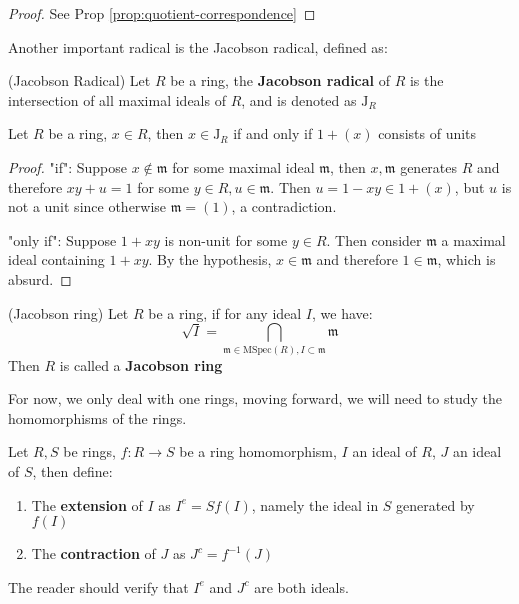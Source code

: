 \documentclass{note-eng}
\begin{document}
\begin{proof}
    See Prop \ref{prop:quotient-correspondence}
\end{proof}

Another important radical is the Jacobson radical, defined as:

\begin{definition}
    (Jacobson Radical) Let $R$ be a ring, the \textbf{Jacobson radical} of $R$ is the intersection of all maximal ideals of $R$, and is denoted as $\mathrm{J}_R$
\end{definition}

\begin{proposition}
    Let $R$ be a ring, $x \in R$, then $x \in \mathrm{J}_R$ if and only if $1 + (x)$ consists of units
\end{proposition}

\begin{proof}
    "if": Suppose $x \notin \mathfrak{m}$ for some maximal ideal $\mathfrak{m}$, then $x, \mathfrak{m}$ generates $R$ and therefore $xy + u = 1$ for some $y \in R, u \in \mathfrak{m}$. Then $u = 1 - xy \in 1 + (x)$, but $u$ is not a unit since otherwise $\mathfrak{m} = (1)$, a contradiction.

    "only if": Suppose $1 + xy$ is non-unit for some $y \in R$. Then consider $\mathfrak{m}$ a maximal ideal containing $1 + xy$. By the hypothesis, $x \in \mathfrak{m}$ and therefore $1 \in \mathfrak{m}$, which is absurd.
\end{proof}

\begin{definition}
    (Jacobson ring) Let $R$ be a ring, if for any ideal $I$, we have:
    $$\sqrt{I} = \bigcap\limits_{\mathfrak{m} \in \mathrm{MSpec}(R), I \subset \mathfrak{m}} \mathfrak{m}$$
    Then $R$ is called a \textbf{Jacobson ring}
\end{definition}

\fi

For now, we only deal with one rings, moving forward, we will need to study the homomorphisms of the rings.

\begin{definition}
    Let $R, S$ be rings, $f: R \rightarrow S$ be a ring homomorphism, $I$ an ideal of $R$, $J$ an ideal of $S$, then define:
    \begin{enumerate}
        \item The \textbf{extension} of $I$ as $I^e = Sf(I)$, namely the ideal in $S$ generated by $f(I)$
        \item The \textbf{contraction} of $J$ as $J^c = f ^{-1} (J)$
    \end{enumerate}
    The reader should verify that $I^e$ and $J^c$ are both ideals.
\end{definition}
\end{document}
